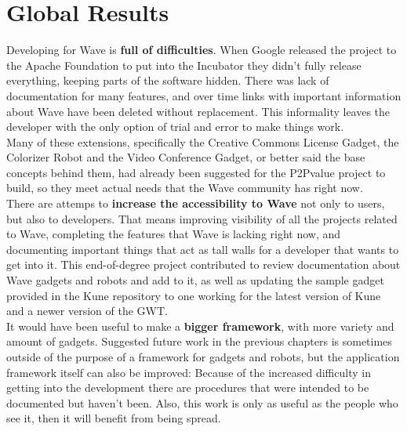 \newpage
\thispagestyle{sectioned}
\chapter{Global Results}
Developing for Wave is \textbf{full of difficulties}. When Google released the project to the Apache Foundation to put into the Incubator they didn't fully release everything, keeping parts of the software hidden. There was lack of documentation for many features, and over time links with important information about Wave have been deleted without replacement. This informality leaves the developer with the only option of trial and error to make things work.\\[.2cm]
Many of these extensions, specifically the Creative Commons License Gadget, the Colorizer Robot and the Video Conference Gadget, or better said the base concepts behind them, had already been suggested for the P2Pvalue project to build, so they meet actual needs that the Wave community has right now.\\[.2cm]
There are attemps to \textbf{increase the accessibility to Wave} not only to users, but also to developers. That means improving visibility of all the projects related to Wave, completing the features that Wave is lacking right now, and documenting important things that act as tall walls for a developer that wants to get into it. This end-of-degree project contributed to review documentation about Wave gadgets and robots and add to it, as well as updating the sample gadget provided in the Kune repository to one working for the latest version of Kune and a newer version of the GWT.\\[.2cm]
It would have been useful to make a \textbf{bigger framework}, with more variety and amount of gadgets. Suggested future work in the previous chapters is sometimes outside of the purpose of a framework for gadgets and robots, but the application framework itself can also be improved: Because of the increased difficulty in getting into the development there are procedures that were intended to be documented but haven't been. Also, this work is only as useful as the people who see it, then it will benefit from being spread.
